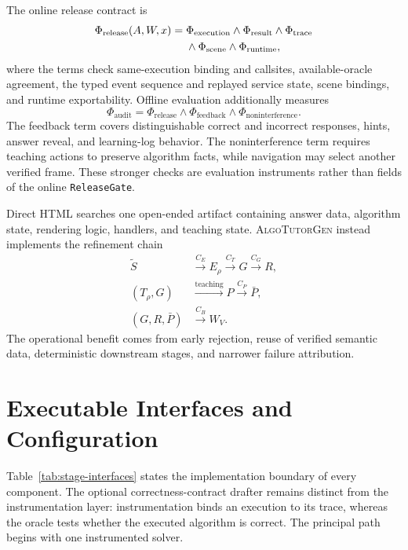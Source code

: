 \documentclass[letterpaper]{article}
\newcommand{\system}{\textsc{AlgoTutorGen}}
\begin{document}
The online release contract is
\begin{align}
\Phi_{\mathrm{release}}(A,W,x)={}&
\Phi_{\mathrm{execution}}\land\Phi_{\mathrm{result}}
\land\Phi_{\mathrm{trace}}\notag\\
&{}\land\Phi_{\mathrm{scene}}\land\Phi_{\mathrm{runtime}},
\end{align}
where the terms check same-execution binding and callsites, available-oracle agreement, the typed event sequence and replayed service state, scene bindings, and runtime exportability. Offline evaluation additionally measures
\[
\Phi_{\mathrm{audit}}=\Phi_{\mathrm{release}}\land
\Phi_{\mathrm{feedback}}\land\Phi_{\mathrm{noninterference}}.
\]
The feedback term covers distinguishable correct and incorrect responses, hints, answer reveal, and learning-log behavior. The noninterference term requires teaching actions to preserve algorithm facts, while navigation may select another verified frame. These stronger checks are evaluation instruments rather than fields of the online \texttt{ReleaseGate}.

Direct HTML searches one open-ended artifact containing answer data, algorithm state, rendering logic, handlers, and teaching state. \system{} instead implements the refinement chain
\[
\begin{aligned}
\widetilde S&\xrightarrow{C_E}E_\rho
\xrightarrow{C_T}G\xrightarrow{C_G}R,\\
(T_\rho,G)&\xrightarrow{\mathrm{teaching}}P\xrightarrow{C_P}\bar P,\\
(G,R,\bar P)&\xrightarrow{C_B}W_V.
\end{aligned}
\]
The operational benefit comes from early rejection, reuse of verified semantic data, deterministic downstream stages, and narrower failure attribution.

\section{Executable Interfaces and Configuration}

Table~\ref{tab:stage-interfaces} states the implementation boundary of every component. The optional correctness-contract drafter remains distinct from the instrumentation layer: instrumentation binds an execution to its trace, whereas the oracle tests whether the executed algorithm is correct. The principal path begins with one instrumented solver.
\end{document}

